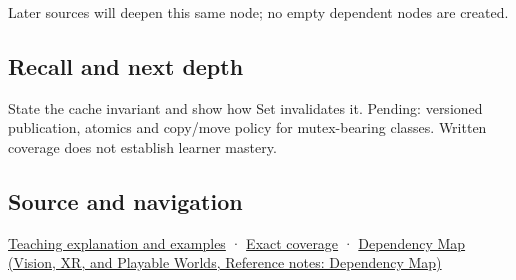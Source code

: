 \hypertarget{appendix-f5593256bcaf-used-by}{}

Later sources will deepen this same node; no empty dependent nodes are created.

\subsection{Recall and next depth}\label{appendix-f5593256bcaf-recall-and-next-depth}

\hypertarget{appendix-f5593256bcaf-recall-and-next-depth}{}

State the cache invariant and show how Set invalidates it. Pending: versioned publication, atomics and copy/move policy for mutex-bearing classes. Written coverage does not establish learner mastery.

\subsection{Source and navigation}\label{appendix-f5593256bcaf-source-and-navigation}

\hypertarget{appendix-f5593256bcaf-source-and-navigation}{}

\hyperref[01-foundations-i-ch003-a-cache-may-change-bits-without-changing-meaning]{Teaching explanation and examples} · \hyperref[appendix-fd090d982a15-m008---parts-113-126]{Exact coverage} · \href{../07-Vision-XR-and-Playable-Worlds/main.pdf\#nameddest=appendix-4ad47bdd269a}{Dependency Map (Vision, XR, and Playable Worlds, Reference notes: Dependency Map)}
